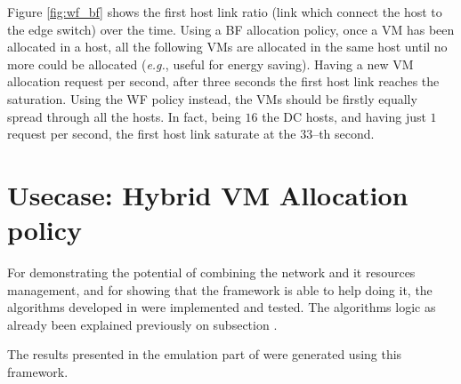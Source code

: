 \documentclass[12pt,english,oneside]{book}
\begin{document}
Figure \ref{fig:wf_bf} shows the first host link ratio (link which connect the host to the edge switch) over the time.
Using a BF allocation policy, once a VM has been allocated in a host, all the following VMs are allocated in the same host until no more could be allocated (\textit{e.g.}, useful for energy saving). Having a new VM allocation request per second, after three seconds the first host link reaches the saturation.
Using the WF policy instead, the VMs should be firstly equally spread through all the hosts. In fact, being $16$ the DC hosts, and having just $1$ request per second, the first host link saturate at the $33$--th second.

\newpage

\section{Usecase: Hybrid VM Allocation policy}

For demonstrating the potential of combining the network and it resources management, and for showing that the framework is able to help doing it, the algorithms developed in \cite{im2013} were implemented and tested. The algorithms logic as already been explained previously on subsection \label{subsec:userdeflog}.

The results presented in the emulation part of \cite{im2013} were generated using this framework.
\end{document}
